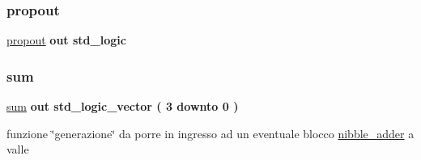 \mbox{\label{group___nibble_adder_ga5957c9cdd706cafd2da8855133a002c9}} 
\subsubsection{\texorpdfstring{propout}{propout}}
{\footnotesize\ttfamily \hyperlink{group___nibble_adder_ga5957c9cdd706cafd2da8855133a002c9}{propout} {\bfseries \textcolor{vhdlchar}{out}\textcolor{vhdlchar}{ }} {\bfseries \textcolor{vhdlchar}{std\+\_\+logic}\textcolor{vhdlchar}{ }} \hspace{0.3cm}{\ttfamily [Port]}}

\mbox{\label{group___nibble_adder_gadfe538323c3296159dd3b383325a996b}} 
\subsubsection{\texorpdfstring{sum}{sum}}
{\footnotesize\ttfamily \hyperlink{group___nibble_adder_gadfe538323c3296159dd3b383325a996b}{sum} {\bfseries \textcolor{vhdlchar}{out}\textcolor{vhdlchar}{ }} {\bfseries \textcolor{vhdlchar}{std\+\_\+logic\+\_\+vector}\textcolor{vhdlchar}{ }\textcolor{vhdlchar}{(}\textcolor{vhdlchar}{ }\textcolor{vhdlchar}{ } \textcolor{vhdldigit}{3} \textcolor{vhdlchar}{ }\textcolor{vhdlchar}{downto}\textcolor{vhdlchar}{ }\textcolor{vhdlchar}{ } \textcolor{vhdldigit}{0} \textcolor{vhdlchar}{ }\textcolor{vhdlchar}{)}\textcolor{vhdlchar}{ }} \hspace{0.3cm}{\ttfamily [Port]}}

funzione \char`\"{}generazione\char`\"{} da porre in ingresso ad un eventuale blocco \hyperlink{classnibble__adder}{nibble\+\_\+adder} a valle 